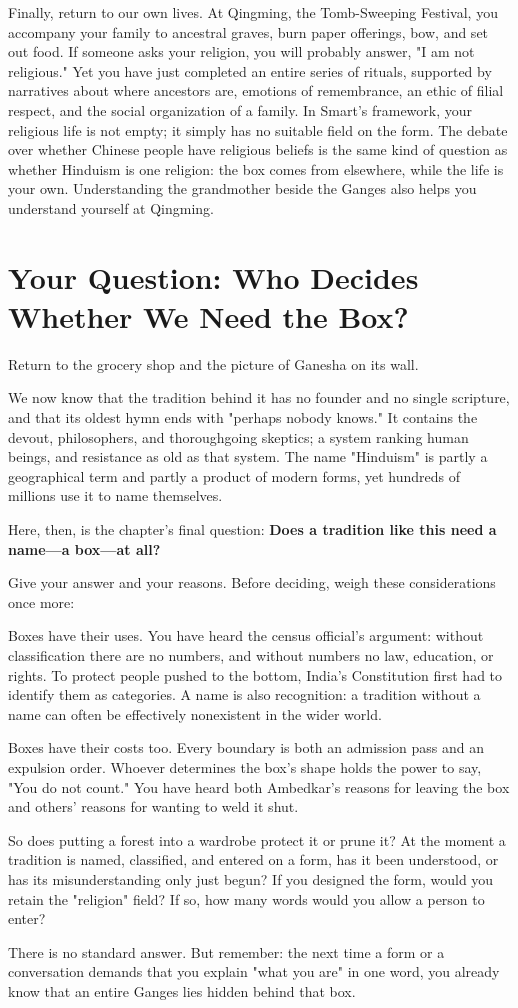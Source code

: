 Finally, return to our own lives. At Qingming, the Tomb-Sweeping Festival, you accompany your family to ancestral graves, burn paper offerings, bow, and set out food. If someone asks your religion, you will probably answer, "I am not religious." Yet you have just completed an entire series of rituals, supported by narratives about where ancestors are, emotions of remembrance, an ethic of filial respect, and the social organization of a family. In Smart's framework, your religious life is not empty; it simply has no suitable field on the form. The debate over whether Chinese people have religious beliefs is the same kind of question as whether Hinduism is one religion: the box comes from elsewhere, while the life is your own. Understanding the grandmother beside the Ganges also helps you understand yourself at Qingming.

\section[Your Question: Who Decides the Box?]{Your Question: Who Decides Whether We Need the Box?}
Return to the grocery shop and the picture of Ganesha on its wall.

We now know that the tradition behind it has no founder and no single scripture, and that its oldest hymn ends with "perhaps nobody knows." It contains the devout, philosophers, and thoroughgoing skeptics; a system ranking human beings, and resistance as old as that system. The name "Hinduism" is partly a geographical term and partly a product of modern forms, yet hundreds of millions use it to name themselves.

Here, then, is the chapter's final question: \textbf{Does a tradition like this need a name---a box---at all?}

Give your answer and your reasons. Before deciding, weigh these considerations once more:

Boxes have their uses. You have heard the census official's argument: without classification there are no numbers, and without numbers no law, education, or rights. To protect people pushed to the bottom, India's Constitution first had to identify them as categories. A name is also recognition: a tradition without a name can often be effectively nonexistent in the wider world.

Boxes have their costs too. Every boundary is both an admission pass and an expulsion order. Whoever determines the box's shape holds the power to say, "You do not count." You have heard both Ambedkar's reasons for leaving the box and others' reasons for wanting to weld it shut.

So does putting a forest into a wardrobe protect it or prune it? At the moment a tradition is named, classified, and entered on a form, has it been understood, or has its misunderstanding only just begun? If you designed the form, would you retain the "religion" field? If so, how many words would you allow a person to enter?

There is no standard answer. But remember: the next time a form or a conversation demands that you explain "what you are" in one word, you already know that an entire Ganges lies hidden behind that box.
